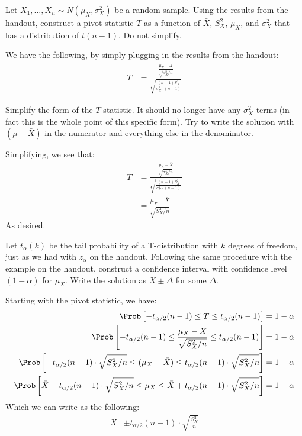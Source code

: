 
Let $X_1, \ldots, X_n \sim N(\mu_X, \sigma_X^2)$ be a random sample. Using
the results from the handout, construct a pivot statistic $T$ as a function
of $\bar{X}$, $S_X^2$, $\mu_X$, and $\sigma_X^2$ that has a distribution of
$t(n-1)$. Do not simplify.


We have the following, by simply plugging in the results from the handout:
\begin{align*}
T &= \frac{\frac{\mu_X - \bar{X}}{\sqrt{\sigma_X^2 / n}}}{\sqrt{\frac{(n-1)S^2_X}{\sigma_X^2 \cdot (n-1)}}}
\end{align*}


Simplify the form of the $T$ statistic. It should no longer have any
$\sigma_X^2$ terms (in fact this is the whole point of this specific form). 
Try to write the solution with $(\mu - \bar{X})$ in the numerator and
everything else in the denominator.


Simplifying, we see that:
\begin{align*}
T &= \frac{\frac{\mu_X - \bar{X}}{\sqrt{\sigma_X^2 / n}}}{\sqrt{\frac{(n-1)S^2_X}{\sigma_X^2 \cdot (n-1)}}} \\
&= \frac{\mu_X - \bar{X}}{\sqrt{S^2_X / n}}
\end{align*}
As desired.


Let $t_\alpha(k)$ be the tail probability of a T-distribution with $k$
degrees of freedom, just as we had with $z_\alpha$ on the handout. Following
the same procedure with the example on the handout, construct a confidence
interval with confidence level $(1 - \alpha)$ for $\mu_X$. Write the solution
as $\bar{X} \pm \Delta$ for some $\Delta$.


Starting with the pivot statistic, we have:
\begin{align*}
\Prob\left[ -t_{\alpha/2}(n-1) \leq T \leq t_{\alpha/2}(n-1) \right] &= 1 - \alpha \\
\Prob\left[ -t_{\alpha/2}(n-1) \leq \frac{\mu_X - \bar{X}}{\sqrt{S^2_X / n}} \leq t_{\alpha/2}(n-1) \right] &= 1 - \alpha \\
\Prob\left[ -t_{\alpha/2}(n-1) \cdot \sqrt{S^2_X / n} \leq (\mu_X - \bar{X}) \leq t_{\alpha/2}(n-1) \cdot \sqrt{S^2_X / n} \right] &= 1 - \alpha \\
\Prob\left[ \bar{X} - t_{\alpha/2}(n-1) \cdot \sqrt{S^2_X / n} \leq \mu_X \leq \bar{X} + t_{\alpha/2}(n-1) \cdot \sqrt{S^2_X / n} \right] &= 1 - \alpha \\
\end{align*}
Which we can write as the following:
\begin{align*}
\bar{X} &\pm t_{\alpha/2}(n-1) \cdot \sqrt{\frac{S^2_X}{n}}
\end{align*}

